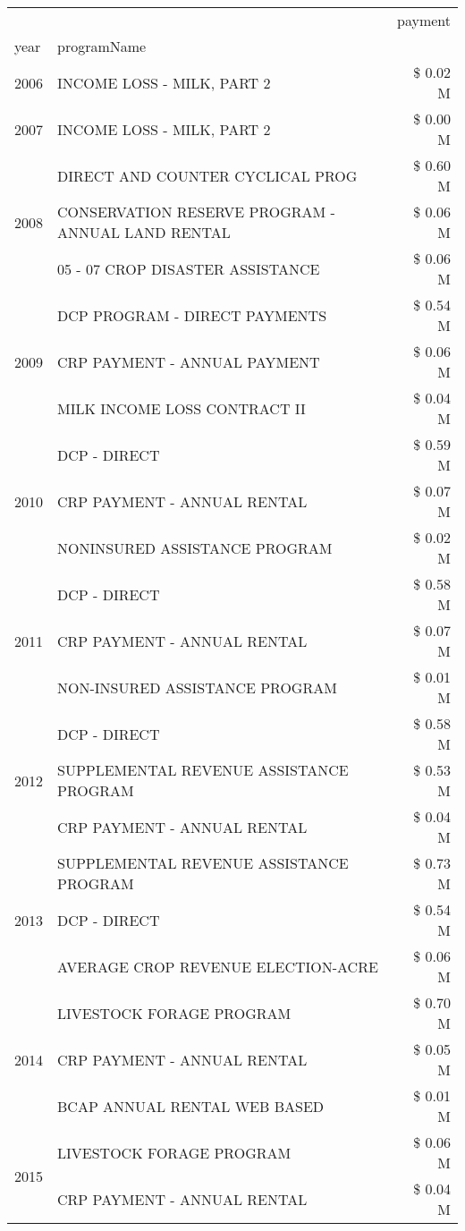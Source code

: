 \begin{tabular}{llr}
\toprule
 &  & payment \\
year & programName &  \\
\midrule
2006 & INCOME LOSS - MILK, PART 2 & \$ 0.02 M \\
\cline{1-3}
2007 & INCOME LOSS - MILK, PART 2 & \$ 0.00 M \\
\cline{1-3}
\multirow[t]{3}{*}{2008} & DIRECT AND COUNTER CYCLICAL PROG & \$ 0.60 M \\
 & CONSERVATION RESERVE PROGRAM - ANNUAL LAND RENTAL & \$ 0.06 M \\
 & 05 - 07 CROP DISASTER ASSISTANCE & \$ 0.06 M \\
\cline{1-3}
\multirow[t]{3}{*}{2009} & DCP PROGRAM - DIRECT PAYMENTS & \$ 0.54 M \\
 & CRP PAYMENT - ANNUAL PAYMENT & \$ 0.06 M \\
 & MILK INCOME LOSS CONTRACT II & \$ 0.04 M \\
\cline{1-3}
\multirow[t]{3}{*}{2010} & DCP - DIRECT & \$ 0.59 M \\
 & CRP PAYMENT - ANNUAL RENTAL & \$ 0.07 M \\
 & NONINSURED ASSISTANCE PROGRAM & \$ 0.02 M \\
\cline{1-3}
\multirow[t]{3}{*}{2011} & DCP - DIRECT & \$ 0.58 M \\
 & CRP PAYMENT - ANNUAL RENTAL & \$ 0.07 M \\
 & NON-INSURED ASSISTANCE PROGRAM & \$ 0.01 M \\
\cline{1-3}
\multirow[t]{3}{*}{2012} & DCP - DIRECT & \$ 0.58 M \\
 & SUPPLEMENTAL REVENUE ASSISTANCE PROGRAM & \$ 0.53 M \\
 & CRP PAYMENT - ANNUAL RENTAL & \$ 0.04 M \\
\cline{1-3}
\multirow[t]{3}{*}{2013} & SUPPLEMENTAL REVENUE ASSISTANCE PROGRAM & \$ 0.73 M \\
 & DCP - DIRECT & \$ 0.54 M \\
 & AVERAGE CROP REVENUE ELECTION-ACRE & \$ 0.06 M \\
\cline{1-3}
\multirow[t]{3}{*}{2014} & LIVESTOCK FORAGE PROGRAM & \$ 0.70 M \\
 & CRP PAYMENT - ANNUAL RENTAL & \$ 0.05 M \\
 & BCAP ANNUAL RENTAL WEB BASED & \$ 0.01 M \\
\cline{1-3}
\multirow[t]{3}{*}{2015} & LIVESTOCK FORAGE PROGRAM & \$ 0.06 M \\
 & CRP PAYMENT - ANNUAL RENTAL & \$ 0.04 M \\

\end{tabular}
